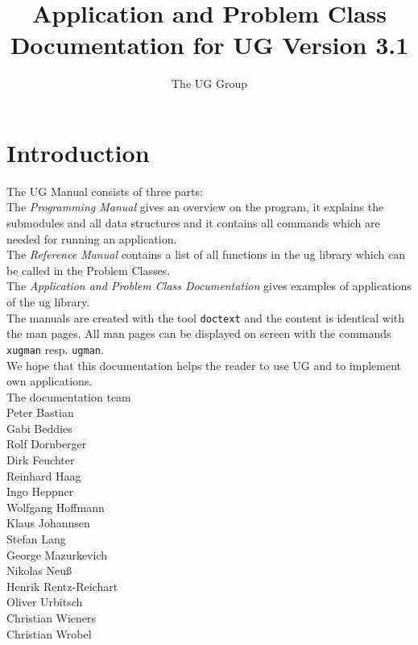 


\pagestyle{myheadings}
\sloppy
\makeindex




\newcommand{\sectitle}{\mbox{}}
\setcounter{page}{0}

\title{Application and Problem Class Documentation for UG Version 3.1}
\author{The UG Group}

\maketitle


\section*{Introduction}

The UG Manual consists of three parts:
\\[5mm]  
The {\em Programming Manual} gives an overview on the program, it
explains the submodules and all data structures and it contains
all commands which are needed for running an application.
\\[5mm]  
The {\em Reference Manual} contains a list of all 
functions in the ug library which can be called in the Problem Classes.
\\[5mm]
The {\em Application and Problem Class Documentation} gives examples
of applications of the ug library.
\\[5mm]
The manuals are created with the tool {\tt doctext} and the content is 
identical with the man pages. All man pages can be displayed on screen 
with the commands {\tt xugman} resp. {\tt ugman}.
\\[5mm]
We hope that this documentation helps the reader to use UG 
and to implement own applications.
\\[1cm]
The documentation team
\\[1cm]
Peter Bastian\\
Gabi Beddies\\
Rolf Dornberger\\
Dirk Feuchter\\
Reinhard Haag\\
Ingo Heppner\\
Wolfgang Hoffmann\\
Klaus Johannsen\\
Stefan Lang\\
George Mazurkevich\\
Nikolas Neu\ss\\
Henrik Rentz-Reichart\\
Oliver Urbitsch\\
Christian Wieners\\
Christian Wrobel

